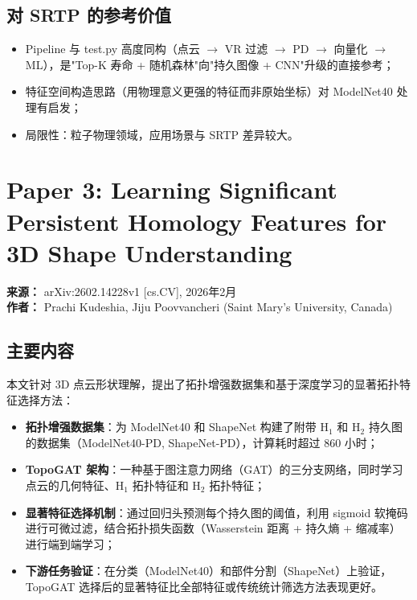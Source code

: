 \documentclass[11pt,a4paper]{article}
\begin{document}
\subsection*{对 SRTP 的参考价值}
\begin{itemize}[nosep]
  \item Pipeline 与 test.py 高度同构（点云 $\to$ VR 过滤 $\to$ PD $\to$ 向量化 $\to$ ML），是"Top-K 寿命 + 随机森林"向"持久图像 + CNN"升级的直接参考；
  \item 特征空间构造思路（用物理意义更强的特征而非原始坐标）对 ModelNet40 处理有启发；
  \item 局限性：粒子物理领域，应用场景与 SRTP 差异较大。
\end{itemize}


\section{Paper 3: Learning Significant Persistent Homology Features for 3D Shape Understanding}

\textbf{来源：} arXiv:2602.14228v1 [cs.CV], 2026年2月 \\
\textbf{作者：} Prachi Kudeshia, Jiju Poovvancheri (Saint Mary's University, Canada)

\subsection*{主要内容}
本文针对 3D 点云形状理解，提出了拓扑增强数据集和基于深度学习的显著拓扑特征选择方法：

\begin{itemize}[nosep]
  \item \textbf{拓扑增强数据集}：为 ModelNet40 和 ShapeNet 构建了附带 H$_1$ 和 H$_2$ 持久图的数据集（ModelNet40-PD, ShapeNet-PD），计算耗时超过 860 小时；
  \item \textbf{TopoGAT 架构}：一种基于图注意力网络（GAT）的三分支网络，同时学习点云的几何特征、H$_1$ 拓扑特征和 H$_2$ 拓扑特征；
  \item \textbf{显著特征选择机制}：通过回归头预测每个持久图的阈值，利用 sigmoid 软掩码进行可微过滤，结合拓扑损失函数（Wasserstein 距离 + 持久熵 + 缩减率）进行端到端学习；
  \item \textbf{下游任务验证}：在分类（ModelNet40）和部件分割（ShapeNet）上验证，TopoGAT 选择后的显著特征比全部特征或传统统计筛选方法表现更好。
\end{itemize}
\end{document}
